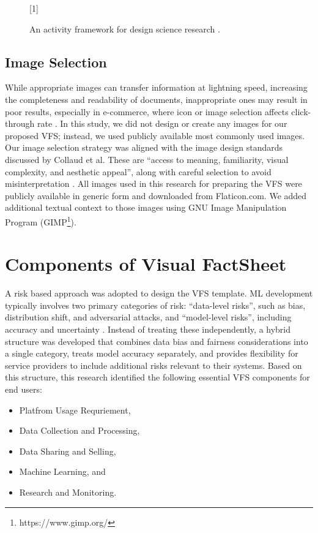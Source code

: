 \documentclass[manuscript,review,anonymous]{acmart}
\begin{document}
	\begin{figure}[h!]
		\centering
		\scalebox{0.90}[1]{}
		\caption{An activity framework for design science research \cite{Kuechler01102008}.}
		\label{fig:designscienceframework}
	\end{figure}

\subsection{Image Selection}
	While appropriate images can transfer information at lightning speed, increasing the completeness and readability of documents, inappropriate ones may result in poor results, especially in e-commerce, where icon or image selection affects click-through rate \cite{Hyun2022} \cite{10.1145/3543873.3584646}. In this study, we did not design or create any images for our proposed VFS; instead, we used publicly available most commonly used images. Our image selection strategy was aligned with the image design standards discussed by Collaud et al. These are \enquote{access to meaning, familiarity, visual complexity, and aesthetic appeal}, along with careful selection to avoid misinterpretation \cite{COLLAUD2022102290}. All images used in this research for preparing the VFS were publicly available in generic form and downloaded from Flaticon.com. We added additional textual context to those images using GNU Image Manipulation Program (GIMP\footnote{https://www.gimp.org/}).

\section{Components of Visual FactSheet}\label{ComponentsVFS}

	A risk based approach was adopted to design the VFS template. ML development typically involves two primary categories of risk: \enquote{data-level risks}, such as bias, distribution shift, and adversarial attacks, and \enquote{model-level risks}, including accuracy and uncertainty \cite{ZHANG2022113800}.  Instead of treating these independently, a hybrid structure was developed that combines data bias and fairness considerations into a single category, treats model accuracy separately, and provides flexibility for service providers to include additional risks relevant to their systems. Based on this structure, this research identified the following essential VFS components for end users:

	\begin{itemize}
		\item Platfrom Usage Requriement,
		\item Data Collection and Processing,
		\item Data Sharing and Selling,
		\item Machine Learning, and
		\item Research and Monitoring.
	\end{itemize}
\end{document}
